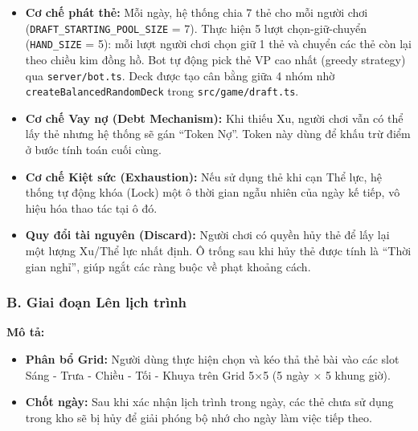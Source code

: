 \begin{itemize}[topsep=0pt, itemsep=2pt, leftmargin=1.2cm]

    \item \textbf{Cơ chế phát thẻ:} Mỗi ngày, hệ thống chia 7 thẻ cho mỗi người chơi (\texttt{DRAFT\_STARTING\_POOL\_SIZE} = 7). Thực hiện 5 lượt chọn-giữ-chuyển (\texttt{HAND\_SIZE} = 5): mỗi lượt người chơi chọn giữ 1 thẻ và chuyển các thẻ còn lại theo chiều kim đồng hồ. Bot tự động pick thẻ VP cao nhất (greedy strategy) qua \texttt{server/bot.ts}. Deck được tạo cân bằng giữa 4 nhóm nhờ \texttt{createBalancedRandomDeck} trong \texttt{src/game/draft.ts}.
    
    \item \textbf{Cơ chế Vay nợ (Debt Mechanism):} Khi thiếu Xu, người chơi vẫn có thể lấy thẻ nhưng hệ thống sẽ gán ``Token Nợ''. Token này dùng để khấu trừ điểm ở bước tính toán cuối cùng.
    
    \item \textbf{Cơ chế Kiệt sức (Exhaustion):} Nếu sử dụng thẻ khi cạn Thể lực, hệ thống tự động khóa (Lock) một ô thời gian ngẫu nhiên của ngày kế tiếp, vô hiệu hóa thao tác tại ô đó.
    
    \item \textbf{Quy đổi tài nguyên (Discard):} Người chơi có quyền hủy thẻ để lấy lại một lượng Xu/Thể lực nhất định. Ô trống sau khi hủy thẻ được tính là ``Thời gian nghỉ'', giúp ngắt các ràng buộc về phạt khoảng cách.
    
\end{itemize}


\subsubsection{B. Giai đoạn Lên lịch trình}

\textbf{Mô tả:}

\begin{itemize}[topsep=0pt, itemsep=2pt, leftmargin=1.2cm]

    \item \textbf{Phân bổ Grid:} Người dùng thực hiện chọn và kéo thả thẻ bài vào các slot Sáng - Trưa - Chiều - Tối - Khuya trên Grid 5×5 (5 ngày × 5 khung giờ).
    
    \item \textbf{Chốt ngày:} Sau khi xác nhận lịch trình trong ngày, các thẻ chưa sử dụng trong kho sẽ bị hủy để giải phóng bộ nhớ cho ngày làm việc tiếp theo.
    
\end{itemize}

